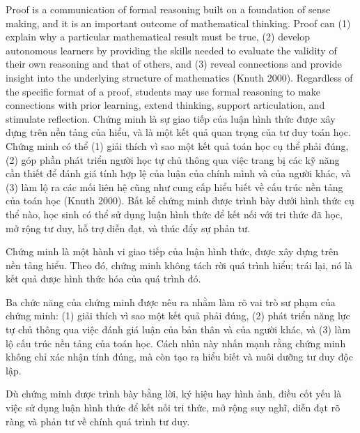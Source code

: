 \documentclass[
  10pt,
  a4paper,
  landscape,
  twoside,
  openany
]{scrbook}
\newcommand{\EN}[1]{#1}
\newcommand{\VI}[1]{#1}
\newcommand{\NOTE}[1]{#1}
\begin{document}
\TriPara
{
\EN{Proof is a communication of formal reasoning built on a foundation of sense making, and it is an important outcome of mathematical thinking. Proof can (1) explain why a particular mathematical result must be true, (2) develop autonomous learners by providing the skills needed to evaluate the validity of their own reasoning and that of others, and (3) reveal connections and provide insight into the underlying structure of mathematics (Knuth 2000). Regardless of the specific format of a proof, students may use formal reasoning to make connections with prior learning, extend thinking, support articulation, and stimulate reflection.}
}
{
\VI{Chứng minh là sự giao tiếp của luận hình thức được xây dựng trên nền tảng của hiểu, và là một kết quả quan trọng của tư duy toán học. Chứng minh có thể (1) giải thích vì sao một kết quả toán học cụ thể phải đúng, (2) góp phần phát triển người học tự chủ thông qua việc trang bị các kỹ năng cần thiết để đánh giá tính hợp lệ của luận của chính mình và của người khác, và (3) làm lộ ra các mối liên hệ cũng như cung cấp hiểu biết về cấu trúc nền tảng của toán học (Knuth 2000). Bất kể chứng minh được trình bày dưới hình thức cụ thể nào, học sinh có thể sử dụng luận hình thức để kết nối với tri thức đã học, mở rộng tư duy, hỗ trợ diễn đạt, và thúc đẩy sự phản tư.}
}
{
\NOTE{Chứng minh là một hành vi giao tiếp của luận hình thức, được xây dựng trên nền tảng hiểu. Theo đó, chứng minh không tách rời quá trình hiểu; trái lại, nó là kết quả được hình thức hóa của quá trình đó.

Ba chức năng của chứng minh được nêu ra nhằm làm rõ vai trò sư phạm của chứng minh: (1) giải thích vì sao một kết quả phải đúng, (2) phát triển năng lực tự chủ thông qua việc đánh giá luận của bản thân và của người khác, và (3) làm lộ cấu trúc nền tảng của toán học. Cách nhìn này nhấn mạnh rằng chứng minh không chỉ xác nhận tính đúng, mà còn tạo ra hiểu biết và nuôi dưỡng tư duy độc lập.

Dù chứng minh được trình bày bằng lời, ký hiệu hay hình ảnh, điều cốt yếu là việc sử dụng luận hình thức để kết nối tri thức, mở rộng suy nghĩ, diễn đạt rõ ràng và phản tư về chính quá trình tư duy.}
}
\end{document}
